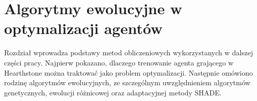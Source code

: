 \chapter{Algorytmy ewolucyjne w optymalizacji agentów} \label{chap:ea}

Rozdział wprowadza podstawy metod obliczeniowych wykorzystanych w dalszej części pracy. Najpierw pokazano, dlaczego trenowanie agenta grającego w Hearthstone można traktować jako problem optymalizacji. Następnie omówiono rodzinę algorytmów ewolucyjnych, ze szczególnym uwzględnieniem algorytmów genetycznych, ewolucji różnicowej oraz adaptacyjnej metody SHADE.










